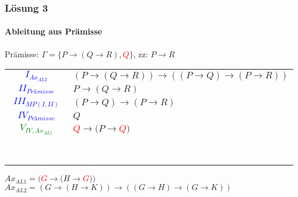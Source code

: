 \begin{frame}
	\frametitle{Lösung 3}
	\framesubtitle{Ableitung aus Prämisse}
	Prämisse: $\Gamma =\{P\rightarrow(Q\rightarrow R), $\textcolor{red}{$Q$}$\}$, zz: $P\rightarrow R$\\
	\begin{tabular}{cl}
		\textcolor{blue}{$I_{Ax_{AL2}}$}           & $(P\rightarrow(Q\rightarrow R))\rightarrow((P\rightarrow Q)\rightarrow(P\rightarrow R))$ \\
		\textcolor{blue}{$II_{\textit{Prämisse}}$} & $P\rightarrow(Q\rightarrow R)$                                                           \\
		\textcolor{blue}{$III_{MP(I, II)}$}        & $(P\rightarrow Q)\rightarrow(P\rightarrow R)$                                            \\
		\textcolor{blue}{$IV_{\textit{Prämisse}}$} & $Q$                                                                                      \\
		\textcolor{green}{$V_{IV, Ax_{AL1}}$}      & \textcolor{red}{$Q$}$\rightarrow(P\rightarrow $\textcolor{red}{$Q$}$)$                   \\
		\textcolor{white}{$VI_{MP(IV, V)}$}        & \textcolor{white}{$P\rightarrow Q$}                                                      \\
		\textcolor{white}{$VII_{MP(III, VI)}$}     & \textcolor{white}{$P\rightarrow R$}                                                      \\
	\end{tabular}
	$Ax_{AL1} = ($\textcolor{red}{$G$}$\rightarrow(H\rightarrow $\textcolor{red}{$G$}$))$\\
	$Ax_{AL2} = (G\rightarrow(H\rightarrow K))\rightarrow((G\rightarrow H)\rightarrow(G\rightarrow K))$\\
\end{frame}
